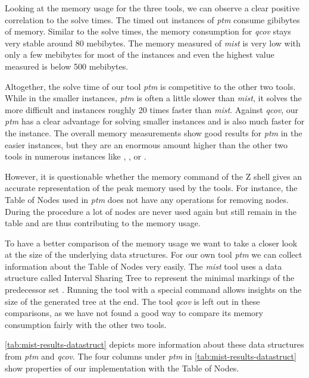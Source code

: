 Looking at the memory usage for the three tools, we can observe a clear positive correlation to the solve times. The timed out instances of \textit{ptm} consume gibibytes of memory. Similar to the solve times, the memory consumption for \textit{qcov} stays very stable around 80 mebibytes. The memory measured of \textit{mist} is very low with only a few mebibytes for most of the instances and even the highest value measured is below 500 mebibytes.

Altogether, the solve time of our tool \textit{ptm} is competitive to the other two tools. While in the smaller instances, \textit{ptm} is often a little slower than \textit{mist}, it solves the more difficult  and  instances roughly 20 times faster than \textit{mist}.
Against \textit{qcov}, our \textit{ptm} has a clear advantage for solving smaller instances and is also much faster for the  instance.
The overall memory measurements show good results for \textit{ptm} in the easier instances, but they are an enormous amount higher than the other two tools in numerous instances like , , or .

\bigbreak

However, it is questionable whether the memory command of the Z shell gives an accurate representation of the peak memory used by the tools. For instance, the Table of Nodes used in \textit{ptm} does not have any operations for removing nodes. During the procedure a lot of nodes are never used again but still remain in the table and are thus contributing to the memory usage.

To have a better comparison of the memory usage we want to take a closer look at the size of the underlying data structures. For our own tool \textit{ptm} we can collect information about the Table of Nodes very easily. The \textit{mist} tool uses a data structure called Interval Sharing Tree to represent the minimal markings of the predecessor set \cite{ganty_07}. Running the tool with a special command allows insights on the size of the generated tree at the end. 
The tool \textit{qcov} is left out in these comparisons, as we have not found a good way to compare its memory consumption fairly with the other two tools. 
\bigbreak

\autoref{tab:mist-results-datastruct} depicts more information about these data structures from \textit{ptm} and \textit{qcov}.
The four columns under \textit{ptm} in \autoref{tab:mist-results-datastruct} show properties of our implementation with the Table of Nodes.

